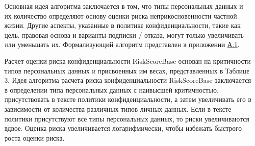 \documentclass[../main]{subfiles}
\begin{document}
Основная идея алгоритма заключается в том, что типы персональных данных и их количество определяют основу оценки риска неприкосновенности частной жизни. Другие аспекты, указанные в политике конфиденциальности, такие как цель, правовая основа и варианты подписки / отказа, могут только увеличивать или уменьшать их. Формализующий алгоритм представлен в приложении \hyperref[sec:appendix11]{А.1}.

Расчет оценки риска конфиденциальности RiskScoreBase основан на критичности типов персональных данных и присвоенных им весах, представленных в Таблице 3. Идея алгоритма расчета риска конфиденциальности RiskScoreBase заключается в определении типа персональных данных с наивысшей критичностью. присутствовать в тексте политики конфиденциальности, а затем увеличивать его в зависимости от количества различных типов личных данных. Если в тексте политики присутствуют все типы персональных данных, то риски увеличиваются вдвое. Оценка риска увеличивается логарифмически, чтобы избежать быстрого роста оценки риска. 
\end{document}
